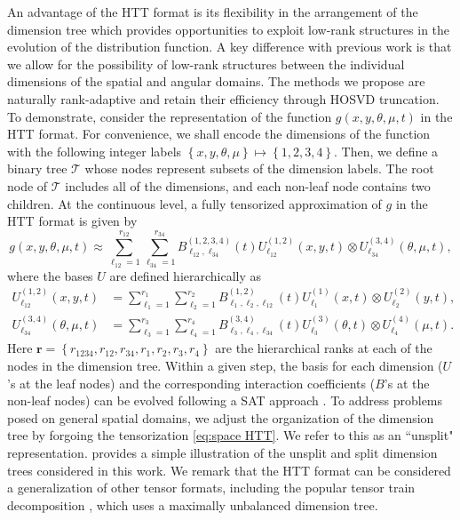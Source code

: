 \documentclass[onefignum,onetabnum]{siamart220329}
\begin{document}
An advantage of the HTT format is its flexibility in the arrangement of the dimension tree which provides opportunities to exploit low-rank structures in the evolution of the distribution function. A key difference with previous work \cite{EinkemmerDLR-AP,hu2022adaptiveBoltzmann} is that we allow for the possibility of low-rank structures between the individual dimensions of the spatial and angular domains. The methods we propose are naturally rank-adaptive and retain their efficiency through HOSVD truncation. To demonstrate, consider the representation of the function $g(x, y, \theta, \mu, t)$ in the HTT format. For convenience, we shall encode the dimensions of the function with the following integer labels $\left\{x, y, \theta, \mu \right\} \mapsto \left\{1, 2, 3, 4 \right\}$. Then, we define a binary tree $\mathcal{T}$ whose nodes represent subsets of the dimension labels. The root node of $\mathcal{T}$ includes all of the dimensions, and each non-leaf node contains two children. At the continuous level, a fully tensorized approximation of $g$ in the HTT format is given by
\begin{equation}
    g(x, y, \theta, \mu,t) \approx \sum_{\ell_{12} = 1}^{r_{12}} \sum_{\ell_{34} = 1}^{r_{34}} B_{\ell_{12}, \ell_{34}}^{(1,2,3,4)} (t) U_{\ell_{12}}^{(1,2)} (x, y, t) \otimes U_{\ell_{34}}^{(3,4)} (\theta, \mu, t), \label{eq:g HTT}
\end{equation}
where the bases $U$ are defined hierarchically as
\begin{align}
    U_{\ell_{12}}^{(1,2)}(x,y,t) &= \sum_{\ell_{1}=1}^{r_{1}} \sum_{\ell_{2}=1}^{r_{2}} B_{\ell_{1},\ell_{2},\ell_{12}}^{(1,2)}(t)  U_{\ell_{1}}^{(1)} (x, t) \otimes U_{\ell_{2}}^{(2)} (y, t), \label{eq:space HTT} \\ 
    U_{\ell_{34}}^{(3,4)}(\theta, \mu, t) &= \sum_{\ell_{3}=1}^{r_{3}} \sum_{\ell_{4}=1}^{r_{4}} B_{\ell_{3},\ell_{4},\ell_{34}}^{(3,4)} (t)  U_{\ell_{3}}^{(3)} (\theta, t)\otimes U_{\ell_{4}}^{(4)} (\mu, t). \label{eq:angular HTT}
\end{align}
Here $\mathbf{r} = \left\{ r_{1234}, r_{12}, r_{34}, r_{1}, r_{2}, r_{3}, r_{4} \right\}$ are the hierarchical ranks at each of the nodes in the dimension tree. Within a given step, the basis for each dimension ($U$'s at the leaf nodes) and the corresponding interaction coefficients ($B$'s at the non-leaf nodes) can be evolved following a SAT approach \cite{GuoVlasovFlowMap2022}. To address problems posed on general spatial domains, we adjust the organization of the dimension tree by forgoing the tensorization \eqref{eq:space HTT}. We refer to this as an ``unsplit" representation.  provides a simple illustration of the unsplit and split dimension trees considered in this work. We remark that the HTT format can be considered a generalization of other tensor formats, including the popular tensor train decomposition \cite{TToseledets2011}, which uses a maximally unbalanced dimension tree.
\end{document}
